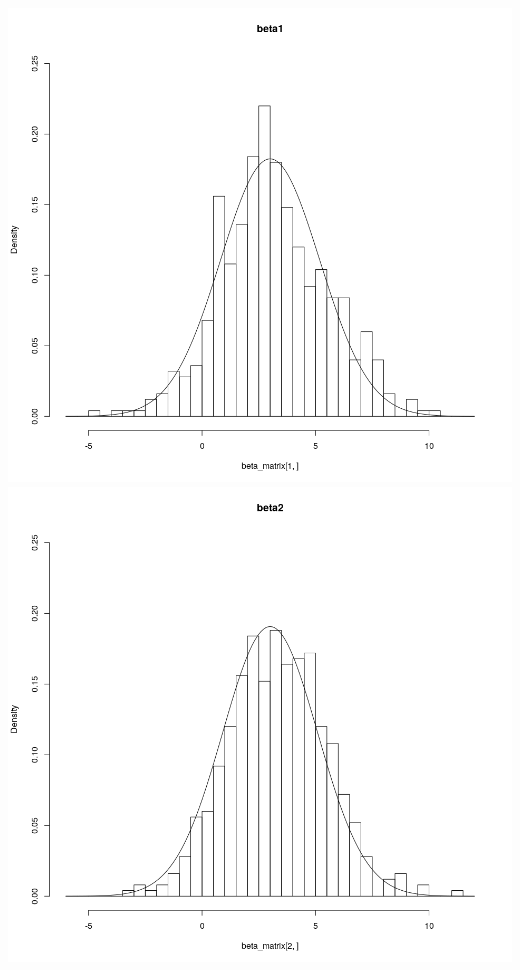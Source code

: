 \documentclass[a4paper,11pt]{article}
\begin{document}
\includegraphics[scale=.35]{521.png} 
\includegraphics[scale=.35]{522.png} 
\end{document}
